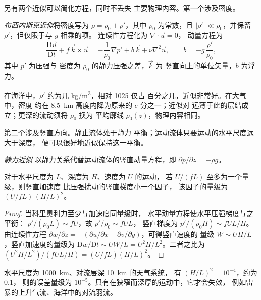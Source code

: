 另有两个近似可以简化方程，同时不丢失
主要物理内容。第一个涉及密度。

\begin{definition}[布西内斯克近似]\label{def:b3:gfd-foundations:boussinesq}
\emph{布西内斯克近似}将密度写为
$\rho = \rho_0 + \rho'$，其中 $\rho_0$ 为常数，且
$|\rho'| \ll \rho_0$，并保留 $\rho'$，但仅限于与 $g$ 相乘的项。
连续性方程化为 $\nabla\cdot\vec u = 0$，
动量方程为
\[
\frac{\mathrm D\vec u}{\mathrm Dt} + f\,\vec k\times\vec u =
-\frac{1}{\rho_0}\nabla p' + b\,\vec k + \nu\nabla^2\vec u ,
\qquad b = -g\,\frac{\rho'}{\rho_0} ,
\]
其中 $p'$ 为压强与
密度为 $\rho_0$ 的静力压强之差，$\vec k$ 为
竖直向上的单位矢量，$b$ 为浮力。
\end{definition}

在海洋中，$\rho'$ 约为几 \unit{kg/m^3}，相对 \num{1025} 仅占
百分之几，近似非常好。在大气中，密度
约在 \qty{8.5}{km} 高度内降为原来的 $e$ 分之一；近似对
远薄于此的层结成立；更深的流动须将 $\rho_0$ 换为
平均廓线 $\rho_0(z)$，物理内容相同。

第二个涉及竖直方向。静止流体处于静力
平衡；运动流体只要运动的水平尺度远大于深度，
便可以很好地近似保持这一平衡。

\begin{definition}[静力近似]\label{def:b3:gfd-foundations:hydrostatic}
\emph{静力近似}
以静力关系代替运动流体的竖直动量方程，即
$\partial p/\partial z = -\rho g$。
\end{definition}

\begin{proposition}[静力近似成立的条件]\label{prop:b3:gfd-foundations:hydrostatic}
对于水平尺度为 $L$、深度为 $H$、速度为 $U$ 的运动，
若 $U/(fL)$ 至多为一个量级，则竖直加速度
比压强扰动的竖直梯度小一个因子，
该因子的量级为 $(U/fL)\,(H/L)^2$。
\end{proposition}

\begin{proof}
当科里奥利力至少与加速度同量级时，
水平动量方程使水平压强梯度与之平衡：
$p'/(\rho_0 L) \sim fU$，故 $p'/\rho_0 \sim fUL$，
竖直梯度为 $p'/(\rho_0 H) \sim fUL/H$。由连续性方程 $\partial w/\partial z
= -(\partial u/\partial x + \partial v/\partial y)$，可得竖直速度的
量级 $W \sim UH/L$，竖直加速度的量级为
$\mathrm Dw/\mathrm Dt \sim UW/L = U^2H/L^2$。二者之比为 $(U^2H/L^2)/(fUL/H)
= (U/fL)(H/L)^2$。
\end{proof}

水平尺度为 \qty{1000}{km}、对流层深 \qty{10}{km} 的天气系统，
有 $(H/L)^2 = 10^{-4}$，约为 0.1，
则的误差量级为 $10^{-5}$。只有在狭窄而深厚的运动中，它才会失效，
例如雷暴的上升气流、海洋中的对流羽流。

